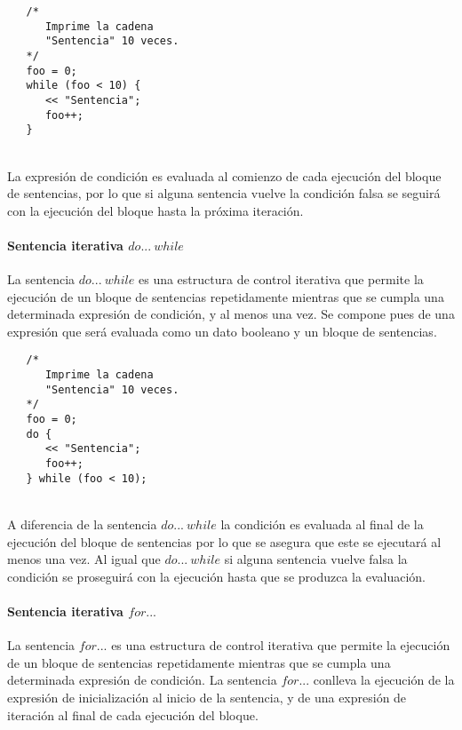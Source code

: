 \begin{lstlisting}
   /*
      Imprime la cadena 
      "Sentencia" 10 veces.
   */
   foo = 0;
   while (foo < 10) {
      << "Sentencia"; 
      foo++;
   }
\end{lstlisting}
\hfill\\

La expresión de condición es evaluada al comienzo de cada ejecución del bloque de sentencias, por lo que si alguna sentencia vuelve 
la condición falsa se seguirá con la ejecución del bloque hasta la próxima iteración.

\paragraph{Sentencia iterativa $do...\ while$} \label{sec:stmt_dowhile}

La sentencia $do...\ while$ es una estructura de control iterativa que permite la ejecución de un bloque de 
sentencias repetidamente mientras que se cumpla una determinada expresión de condición, y al menos una vez. Se compone pues de una expresión que será evaluada como 
un dato booleano y un bloque de sentencias. \\


\begin{lstlisting}
   /*
      Imprime la cadena 
      "Sentencia" 10 veces.
   */
   foo = 0;
   do {
      << "Sentencia"; 
      foo++;
   } while (foo < 10);
\end{lstlisting}
\hfill\\

A diferencia de la sentencia $do...\ while$ la condición es evaluada al final de la ejecución del bloque de sentencias por lo que se asegura que este
se ejecutará al menos una vez. Al igual que $do...\ while$ si alguna sentencia vuelve falsa la condición se proseguirá con la ejecución hasta que se 
produzca la evaluación.

\paragraph{Sentencia iterativa $for...$} \label{sec:stmt_for}

La sentencia $for...$ es una estructura de control iterativa que permite la ejecución de un bloque de 
sentencias repetidamente mientras que se cumpla una determinada expresión de condición. La sentencia $for...$ conlleva
la ejecución de la expresión de inicialización al inicio de la sentencia, y de una expresión de iteración al final de cada ejecución del
bloque. \\

